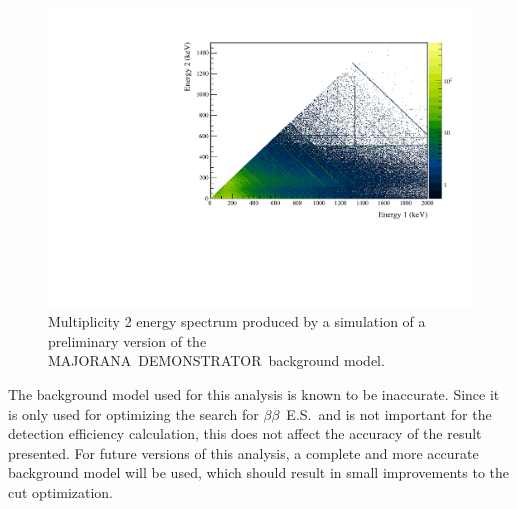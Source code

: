 \documentclass[notitlepage,rmp,aps,10pt]{revtex4-1}
\newcommand{\MJ}{M{\footnotesize AJORANA}}
\newcommand{\Demo}{D{\footnotesize EMON\-STRAT\-OR}}
\newcommand{\MJD}{\MJ\ \Demo}
\newcommand{\bb}{${\beta \beta}$}
\newcommand{\bbes}{\bb~E.S.}
\begin{document}
\begin{figure}
  \centering
  \includegraphics[width=.9\linewidth]{BGsim2D}
  \caption[Simulation of multiplicty 2 events from the background model]{ \label{fig:bgsim2D}
    Multiplicity 2 energy spectrum produced by a simulation of a preliminary version of the \MJD\ background model.
  }
\end{figure}
The background model used for this analysis is known to be inaccurate.
Since it is only used for optimizing the search for \bbes\ and is not important for the detection efficiency calculation, this does not affect the accuracy of the result presented.
For future versions of this analysis, a complete and more accurate background model will be used, which should result in small improvements to the cut optimization.
\end{document}
